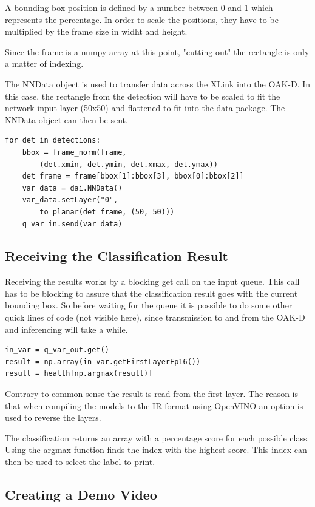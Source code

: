 \documentclass[a4paper,titlepage]{article}
\begin{document}
A bounding box position is defined by a number between 0 and 1 which represents the percentage.
In order to scale the positions, they have to be multiplied by the frame size in widht and height.

Since the frame is a numpy array at this point, "cutting out" the rectangle is only a matter of indexing.

The NNData object is used to transfer data across the XLink into the OAK-D.
In this case, the rectangle from the detection will have to be scaled to fit the network input layer (50x50) and flattened to fit into the data package.
The NNData object can then be sent.

\begin{lstlisting}
for det in detections:
    bbox = frame_norm(frame,
        (det.xmin, det.ymin, det.xmax, det.ymax))
    det_frame = frame[bbox[1]:bbox[3], bbox[0]:bbox[2]]
    var_data = dai.NNData()
    var_data.setLayer("0",
        to_planar(det_frame, (50, 50)))
    q_var_in.send(var_data)
\end{lstlisting}

\subsection{Receiving the Classification Result}

Receiving the results works by a blocking get call on the input queue.
This call has to be blocking to assure that the classification result goes with the current bounding box.
So before waiting for the queue it is possible to do some other quick lines of code (not visible here), since transmission to and from the OAK-D and inferencing will take a while.

\begin{lstlisting}
in_var = q_var_out.get()
result = np.array(in_var.getFirstLayerFp16())
result = health[np.argmax(result)]
\end{lstlisting}

Contrary to common sense the result is read from the first layer.
The reason is that when compiling the models to the IR format using OpenVINO an option is used to reverse the layers.

The classification returns an array with a percentage score for each possible class.
Using the argmax function finds the index with the highest score.
This index can then be used to select the label to print.

\subsection{Creating a Demo Video}
\end{document}
